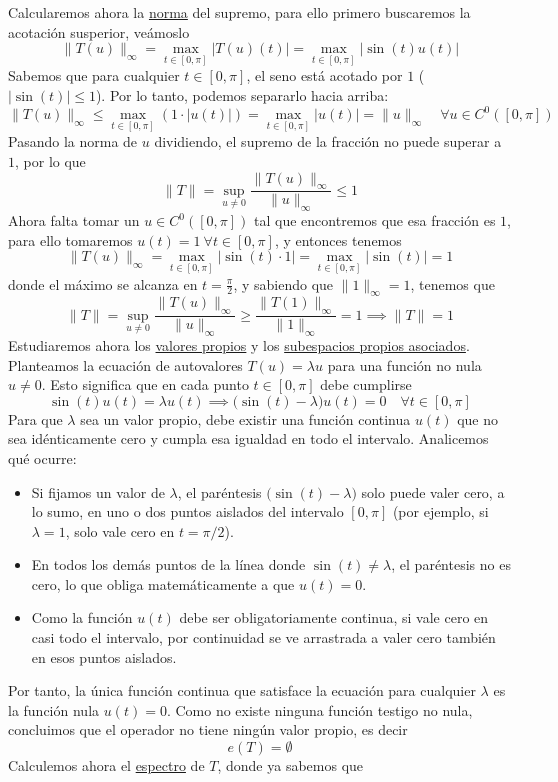 \begin{ejercicio}
    \noindent
    Calcularemos ahora la \underline{norma} del supremo, para ello primero buscaremos la acotación susperior, veámoslo
    $$\|T(u)\|_\infty = \max_{t \in [0,\pi]} |T(u)(t)| = \max_{t \in [0,\pi]} |\sin(t) u(t)|$$
    Sabemos que para cualquier $t \in [0,\pi]$, el seno está acotado por $1$ ($|\sin(t)| \le 1$). Por lo tanto, podemos separarlo hacia arriba:$$\|T(u)\|_\infty \le \max_{t \in [0,\pi]} (1 \cdot |u(t)|) = \max_{t \in [0,\pi]} |u(t)| = \|u\|_\infty \quad \forall u\in C^0([0,\pi])$$
    Pasando la norma de $u$ dividiendo, el supremo de la fracción no puede superar a $1$, por lo que
    $$\|T\| = \sup_{u \neq 0} \frac{\|T(u)\|_\infty}{\|u\|_\infty} \leq 1$$
    Ahora falta tomar un $u\in C^0([0,\pi])$ tal que encontremos que esa fracción es $1$, para ello tomaremos $u(t)=1 \ \forall t\in [0,\pi]$, y entonces tenemos
    \begin{equation*}
        \|T(u)\|_\infty = \max_{t \in [0,\pi]} |\sin(t) \cdot 1| = \max_{t \in [0,\pi]} |\sin(t)| = 1
    \end{equation*}
    donde el máximo se alcanza en $t = \frac{\pi}{2}$, y sabiendo que $\|1\|_\infty = 1$, tenemos que
    $$\|T\| = \sup_{u \neq 0} \frac{\|T(u)\|_\infty}{\|u\|_\infty} \geq \frac{\|T(1)\|_\infty}{\|1\|_\infty} = 1\implies \|T\|=1$$
    Estudiaremos ahora los \underline{valores propios} y los \underline{subespacios propios asociados}. Planteamos la ecuación de autovalores $T(u) = \lambda u$ para una función no nula $u \neq 0$. Esto significa que en cada punto $t \in [0,\pi]$ debe cumplirse
    $$\sin(t) u(t) = \lambda u(t) \implies \big(\sin(t) - \lambda\big) u(t) = 0 \quad \forall t \in [0,\pi]$$
    Para que $\lambda$ sea un valor propio, debe existir una función continua $u(t)$ que no sea idénticamente cero y cumpla esa igualdad en todo el intervalo. Analicemos qué ocurre:
    \begin{itemize}
        \item Si fijamos un valor de $\lambda$, el paréntesis $\big(\sin(t) - \lambda\big)$ solo puede valer cero, a lo sumo, en uno o dos puntos aislados del intervalo $[0,\pi]$ (por ejemplo, si $\lambda = 1$, solo vale cero en $t = \pi/2$).
        \item En todos los demás puntos de la línea donde $\sin(t) \neq \lambda$, el paréntesis no es cero, lo que obliga matemáticamente a que $u(t) = 0$.
        \item Como la función $u(t)$ debe ser obligatoriamente continua, si vale cero en casi todo el intervalo, por continuidad se ve arrastrada a valer cero también en esos puntos aislados.
    \end{itemize}
    Por tanto, la única función continua que satisface la ecuación para cualquier $\lambda$ es la función nula $u(t) = 0$. Como no existe ninguna función testigo no nula, concluimos que el operador no tiene ningún valor propio, es decir
    \begin{equation*}
        e(T)=\emptyset
    \end{equation*}
    Calculemos ahora el \underline{espectro} de $T$, donde ya sabemos que


\end{ejercicio}

